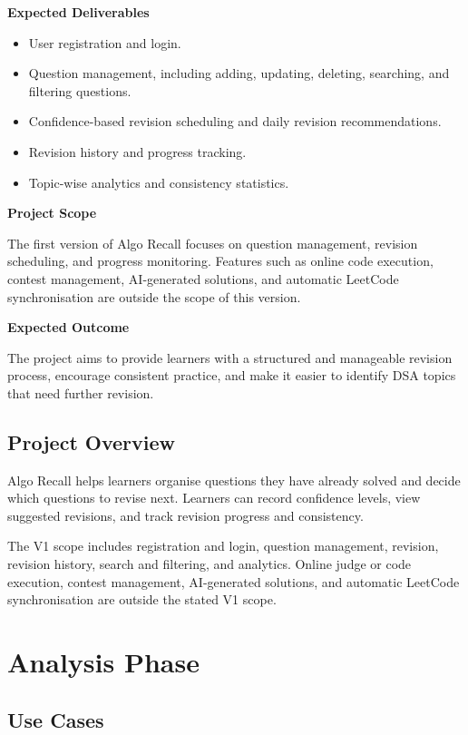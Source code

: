 \documentclass[12pt,a4paper]{report}
\begin{document}
\textbf{Expected Deliverables}

\begin{itemize}
    \item User registration and login.
    \item Question management, including adding, updating, deleting, searching, and filtering questions.
    \item Confidence-based revision scheduling and daily revision recommendations.
    \item Revision history and progress tracking.
    \item Topic-wise analytics and consistency statistics.
\end{itemize}
\textbf{Project Scope}

The first version of Algo Recall focuses on question management, revision scheduling, and progress monitoring. Features such as online code execution, contest management, AI-generated solutions, and automatic LeetCode synchronisation are outside the scope of this version.

\textbf{Expected Outcome}

The project aims to provide learners with a structured and manageable revision process, encourage consistent practice, and make it easier to identify DSA topics that need further revision.

 

\section{Project Overview}
Algo Recall helps learners organise questions they have already solved and decide which
questions to revise next. Learners can record confidence levels, view suggested revisions,
and track revision progress and consistency.

The V1 scope includes registration and login, question management, revision, revision
history, search and filtering, and analytics. Online judge or code execution, contest
management, AI-generated solutions, and automatic LeetCode synchronisation are outside
the stated V1 scope.

\chapter{Analysis Phase}
\section{Use Cases}
\end{document}

